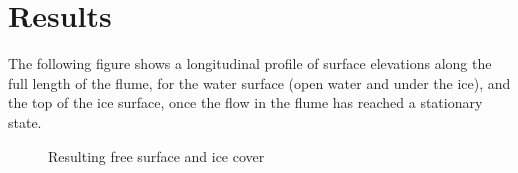 \section{Results}
The following figure shows a longitudinal profile of surface elevations along the full length of the flume, for the water surface (open water and under the ice), and the top of the ice surface, once the flow in the flume has reached a stationary state.

\begin{figure}[H]
    \begin{center}
    \end{center}
    \caption{Resulting free surface and ice cover}
    \label{fig:res-cover_01}
\end{figure}

